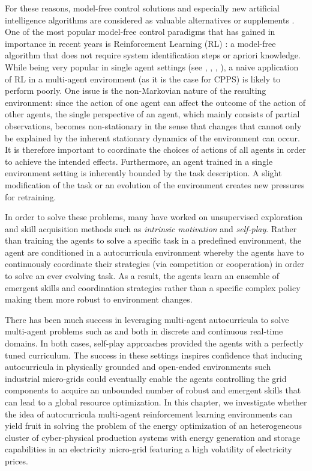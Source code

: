 For these reasons, model-free control solutions and especially new artificial intelligence algorithms are considered as valuable alternatives or supplements \cite{Gholian7236921}. One of the most popular model-free control paradigms that has gained in importance in recent years is Reinforcement Learning (RL) \cite{Sutton9780262039246, bakakeu2018}: a model-free algorithm that does not require system identification steps or apriori knowledge. While being very popular in single agent settings (see \cite{mnih2013playing}, \cite{openai2019solving}, \cite{hausknecht2015deep}, \cite{schulman2017proximal}), a naive application of RL in a multi-agent environment  (as it is the case for CPPS) is likely to perform poorly. One issue is the non-Markovian nature of the resulting environment: since the action of one agent can affect the outcome of the action of other agents, the single perspective of an agent, which mainly consists of partial observations, becomes non-stationary in the sense that changes that cannot only be explained by the inherent stationary dynamics of the environment can occur. It is therefore important to coordinate the choices of actions of all agents in order to achieve the intended effects. Furthermore, an agent trained in a single environment setting is inherently bounded by the task description. A slight modification of the task or an evolution of the environment creates new pressures for retraining.

In order to solve these problems, many have worked on unsupervised exploration and skill acquisition methods such as \textit{intrinsic motivation} and \textit{self-play}. Rather than training the agents to solve a specific task in a predefined environment, the agent are conditioned in a autocurricula environment whereby the agents have to continuously coordinate their strategies (via competition or cooperation) in order to solve an ever evolving task. As a result, the agents learn an ensemble of emergent skills and coordination strategies rather than a specific complex policy making them more robust to environment changes.

There has been much success in leveraging multi-agent autocurricula to solve multi-agent problems such as \cite{lowe2017multiagent} and \cite{bansal2017emergent} both in discrete and continuous real-time domains. In both cases, self-play approaches provided the agents with a perfectly tuned curriculum. The success in these settings inspires confidence that inducing autocurricula in physically grounded and open-ended environments such industrial micro-grids could eventually enable the agents controlling the grid components to acquire an unbounded number of robust and emergent skills that can lead to a global resource optimization. In this chapter, we investigate whether the idea of autocurricula multi-agent reinforcement learning environments can yield fruit in solving the problem of the energy optimization of an heterogeneous cluster of cyber-physical production systems with energy generation and storage capabilities in an electricity micro-grid featuring a high volatility of electricity prices.

